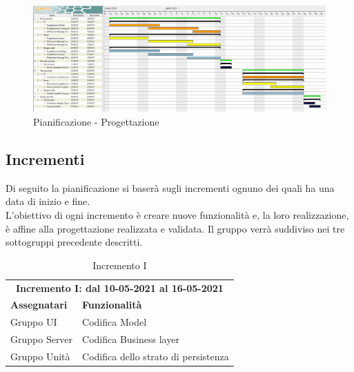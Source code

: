 \newpage
\begin{landscape}
	\begin{figure}[h!]
		\includegraphics[width=24cm]{images/5_periodi}
		\caption{Pianificazione - Progettazione}
	\end{figure}
\end{landscape}

\clearpage
 \subsection{Incrementi}
 Di seguito la pianificazione si baserà sugli incrementi ognuno dei quali ha una data di inizio e fine.\\
  L'obiettivo di ogni incremento è creare nuove funzionalità e, la loro realizzazione, è affine alla progettazione realizzata e validata.
  Il gruppo verrà suddiviso nei tre sottogruppi precedente descritti.
  
  \begin{table} [h!]
  	\begin{center}
  		\begin{tabular} { m{4cm}  m{11cm}  }	
  			\multicolumn{2}{c}{	\textbf{Incremento I: dal 10-05-2021 al 16-05-2021}} \\
  			\rowcolor{lightgray}
  			\textbf{Assegnatari} & \textbf{Funzionalità} \\
  			Gruppo UI & Codifica Model\\
  			Gruppo Server & Codifica Business layer\\
  			Gruppo Unità & Codifica dello strato di persistenza\\	
  		\end{tabular}
  		\caption{Incremento I}
  	\end{center}
  \end{table}

